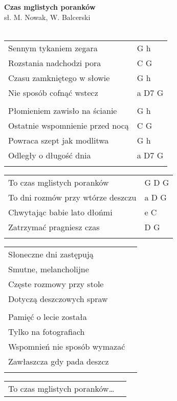 \documentclass[a5paper]{article}
\begin{document}


\noindent
\fontsize{12pt}{15pt}\selectfont
\textbf{Czas mglistych poranków} \\
\fontsize{8pt}{10pt}\selectfont
sł. M. Nowak, W. Balcerski \\ \\
\fontsize{10pt}{12pt}\selectfont
{}
\begin{tabular}{@{}p{8.50cm}p{3cm}@{}}
\noindent
Sennym tykaniem zegara & G h \\
Rozstania nadchodzi pora & C G \\
Czasu zamkniętego w słowie & G h \\
Nie sposób cofnąć wstecz & a D7 G \\ \\

Płomieniem zawisło na ścianie & G h \\
Ostatnie wspomnienie przed nocą & C G \\
Powraca szept jak modlitwa & G h \\
Odległy o długość dnia & a D7 G \\ \\
\end{tabular}

\noindent
\begin{tabular}{@{}p{7.50cm}p{3cm}@{}}
To czas mglistych poranków & G D G \\
To dni rozmów przy wtórze deszczu & a D G \\
Chwytając babie lato dłońmi & e C \\
Zatrzymać pragniesz czas & D G \\ \\
\end{tabular}

\noindent
\begin{tabular}{@{}p{7.50cm}p{3cm}@{}}
Słoneczne dni zastępują \\
Smutne, melancholijne\\
Częste rozmowy przy stole \\
Dotyczą deszczowych spraw \\ \\

Pamięć o lecie została \\
Tylko na fotografiach\\
Wspomnień nie sposób wymazać\\
Zawłaszcza gdy pada deszcz\\\\
\end{tabular}

\noindent
\begin{tabular}{@{}p{7.50cm}p{3cm}@{}}
To czas mglistych poranków…
\end{tabular}
\end{document}
